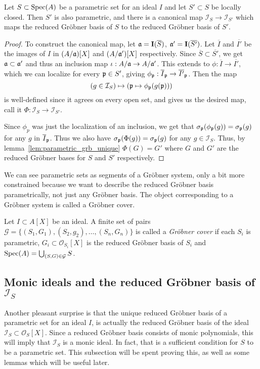 \begin{proposition}\label{prop:subs_of_para_is_para}
  Let $S \subset \operatorname{Spec}(A)$ be a parametric set for an ideal $I$ and let $S' \subset S$ be locally closed. Then $S'$ is also parametric, and there is a canonical map $\mathcal I_{S} \to \mathcal I_{S'}$ which maps the reduced Gröbner basis of $S$ to the reduced Gröbner basis of $S'$.
\end{proposition}
\begin{proof}
  To construct the canonical map, let $\mathfrak{a} = \operatorname{\mathbf I}(\overline S)$, $\mathfrak{a}' = \operatorname{\mathbf I}(\overline{S'})$. Let $\overline I$ and $\overline{I'}$ be the images of $I$ in $(A/\mathfrak{a})[X]$ and $(A/\mathfrak{a}')[X]$ respectively. Since $\overline S \subset \overline{S'}$, we get $\mathfrak{a} \subset \mathfrak{a}'$ and thus an inclusion map $\iota : A/\mathfrak{a} \to A/\mathfrak{a}'$. This extends to $\phi : \overline I \to \overline{I'}$, which we can localize for every $\mathfrak p \in S'$, giving $\phi_{\mathfrak p} : \overline I_{\mathfrak p} \to \overline{I'}_{\mathfrak p}$. Then the map
  \[(g \in \mathcal I_{S}) \mapsto (\mathfrak p \mapsto \phi_{\mathfrak p}(g(\mathfrak p)))\]
  is well-defined since it agrees on every open set, and gives us the desired map, call it $\Phi : \mathcal I_{S} \to \mathcal I_{S'}$.

  Since $\phi_{p}$ was just the localization of an inclusion, we get that $\sigma_{\mathfrak p}(\phi_{\mathfrak p}(g)) = \sigma_{\mathfrak p}(g)$ for any $g$ in $\overline I_{\mathfrak p}$. Thus we also have $\sigma_{\mathfrak p}(\Phi(g)) = \sigma_{\mathfrak p}(g)$ for any $g \in \mathcal I_{S}$. Thus, by lemma~\ref{lem:parametric_grb_unique} $\Phi(G) = G'$ where $G$ and $G'$ are the reduced Gröbner bases for $S$ and $S'$ respectively.
\end{proof}

We can see parametric sets as segments of a Gröbner system, only a bit more constrained because we want to describe the reduced Gröbner basis parametrically, not just any Gröbner basis. The object corresponding to a Gröbner system is called a Gröbner cover.

\begin{definition}\label{def:grb_cover}
  Let $I \subset A[X]$ be an ideal. A finite set of pairs $\mathcal G = \{(S_{1}, G_{1}), (S_{2}, g_{2}), \dots, (S_{n}, G_{n})\}$ is called a \textit{Gröbner cover} if each $S_{i}$ is parametric, $G_{i} \subset \mathcal O_{S_{i}}[X]$ is the reduced Gröbner basis of $S_{i}$ and $\operatorname{Spec}(A) = \bigcup_{(S, G) \in \mathcal G} S$.
\end{definition}


\subsection{Monic ideals and the reduced Gröbner basis of $\mathcal I_{S}$}
Another pleasant surprise is that the unique reduced Gröbner basis of a parametric set for an ideal $I$, is actually the reduced Gröbner basis of the ideal $\mathcal I_{S} \subset \mathcal O_{S}[X]$. Since a reduced Gröbner basis consists of monic polynomials, this will imply that $\mathcal I_{S}$ is a monic ideal. In fact, that is a sufficient condition for $S$ to be a parametric set. This subsection will be spent proving this, as well as some lemmas which will be useful later.

